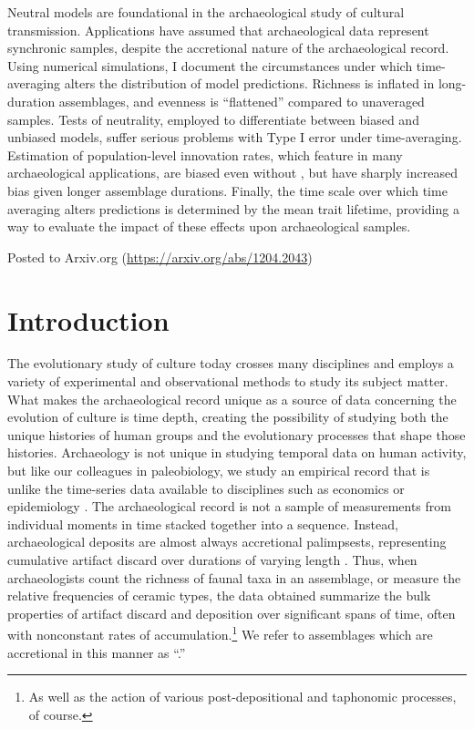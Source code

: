 \begin{description}[leftmargin=-1\labelwidth]
\item[\textsc{Abstract}] Neutral models are foundational in the archaeological study of cultural transmission.  Applications have assumed that archaeological data represent synchronic samples, despite the accretional nature of the archaeological record.  Using numerical simulations, I document the circumstances under which time-averaging alters the distribution of model predictions.  Richness is inflated in long-duration assemblages, and evenness is ``flattened'' compared to unaveraged samples.  Tests of neutrality, employed to differentiate between biased and unbiased models, suffer serious problems with Type I error under time-averaging.  Estimation of population-level innovation rates, which feature in many archaeological applications, are biased even without \timeav, but have sharply increased bias given longer assemblage durations.  Finally, the time scale over which time averaging alters predictions is determined by the mean trait lifetime, providing a way to evaluate the impact of these effects upon archaeological samples.

\item[\textsc{Source}]  Posted to Arxiv.org (\url{https://arxiv.org/abs/1204.2043}) 
\end{description}


\section{Introduction}\label{ta:sec:introduction}
 
The evolutionary study of culture today crosses many disciplines and employs a variety of experimental and observational methods to study its subject matter.  What makes the archaeological record unique as a source of data concerning the evolution of culture is time depth, creating the possibility of studying both the unique histories of human groups and the evolutionary processes that shape those histories.  Archaeology is not unique in studying temporal data on human activity, but like our colleagues in paleobiology, we study an empirical record that is unlike the time-series data available to disciplines such as economics or epidemiology \citep[e.g.,][]{arrow2009some,keeling2005implications,keeling2007modeling,kendall1953analysis,rothman2008modern}. The archaeological record is not a sample of measurements from individual moments in time stacked together into a sequence.  Instead, archaeological deposits are almost always accretional palimpsests, representing cumulative artifact discard over durations of varying length \citep{bailey2007time,Bailey1981,binford1981behavioral,Schiffer1987,Stein1987}.  Thus, when archaeologists count the richness of faunal taxa in an assemblage, or measure the relative frequencies of ceramic types, the data obtained summarize the bulk properties of artifact discard and deposition over significant spans of time, often with nonconstant rates of accumulation.\footnote{As well as the action of various post-depositional and taphonomic processes, of course.}  We refer to assemblages which are accretional in this manner as ``\timeavd.''  


